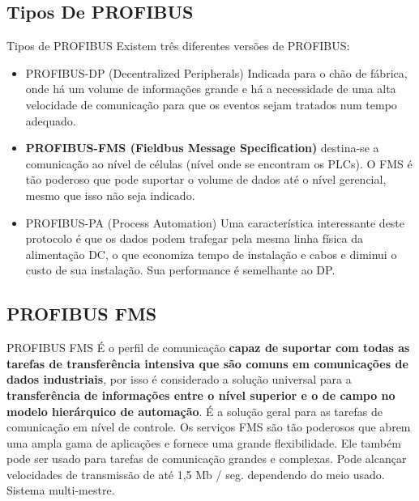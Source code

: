 \documentclass{beamer}
\begin{document}
\subsection{Tipos De PROFIBUS}
\begin{frame}{Tipos de PROFIBUS}
Existem três diferentes versões de PROFIBUS:
\begin{itemize}
\pause \item PROFIBUS-DP (Decentralized Peripherals) Indicada para o chão de fábrica, onde há um volume de informações grande e há a necessidade de uma alta velocidade de comunicação para que os eventos sejam tratados num tempo adequado.

\pause \item \textbf{PROFIBUS-FMS (Fieldbus Message Specification)} destina-se a comunicação ao nível de células (nível onde se encontram os PLCs). O FMS é tão poderoso que pode suportar o volume de dados até o nível gerencial, mesmo que isso não seja indicado.

\pause \item PROFIBUS-PA (Process Automation) Uma característica interessante deste protocolo é que os dados podem trafegar pela mesma linha física da alimentação DC, o que economiza tempo de instalação e cabos e diminui o custo de sua instalação. Sua performance é semelhante ao DP.
\end{itemize}

\end{frame}

\subsection{PROFIBUS FMS}
\begin{frame}{PROFIBUS FMS}
É o perfil de comunicação \textbf{capaz de suportar com todas as tarefas de transferência intensiva que são comuns em comunicações de dados industriais}, por isso é considerado a solução universal para a \textbf{transferência de informações entre o nível superior e o de campo no modelo hierárquico de automação}. É a solução geral para as tarefas de comunicação em nível de controle. Os serviços FMS são tão poderosos que abrem uma ampla gama de aplicações e fornece uma grande flexibilidade. Ele também pode ser usado para tarefas de comunicação grandes e complexas. Pode alcançar velocidades de transmissão de até 1,5 Mb / seg. dependendo do meio usado. Sistema multi-mestre.

\end{frame}
\end{document}
